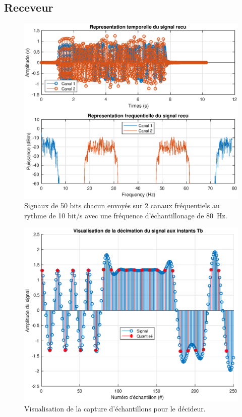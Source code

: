 \documentclass[10pt, oneside, a4paper]{article}
\begin{document}
\subsection{Receveur}

\begin{figure}[htbp]
	\includegraphics[width=\textwidth]{eps/receiver.eps}
	\caption{Signaux de 50 bits chacun envoyés sur 2 canaux fréquentiels au rythme de 10 bit/s
			 avec une fréquence d'échantillonage de \SI{80}{\hertz}.}
	\label{fig:receiver}
\end{figure}

\begin{figure}[htbp]
	\includegraphics[width=\textwidth]{eps/decimate.eps}
	\caption{Visualisation de la capture d'échantillons pour le décideur.}
	\label{fig:decimate}
\end{figure}
\end{document}
